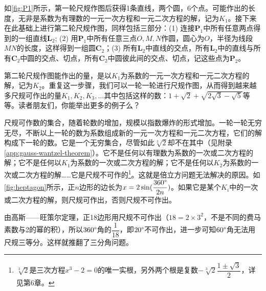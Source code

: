 \documentclass[b5paper]{ctexart}
\begin{document}
如\cref{fig:P1}所示，第一轮尺规作图后获得1条直线，两个圆，6个点。可能作出的长度，无非是系数为有理数的一元一次方程和一元二次方程的解，记为$K_1$。接下来在此基础上进行第二轮尺规作图，同样包括三部分：(1) 连接$\mathbf{P}_1$中所有任意两点得到的一组直线$\mathbf{L}_2$; (2) 用$\mathbf{P}_1$中所有任意三点$O, M, N$作圆，圆心为$O$，半径为线段$MN$的长度，这样得到一组圆$\mathbf{C}_2$；(3) 所有$\mathbf{L}_2$中直线的交点，所有$\mathbf{L}_2$中的直线与所有$\mathbf{C}_2$中圆的交点、切点，所有$\mathbf{C}_2$中圆彼此间的交点、切点，记这些点为$\mathbf{P}_2$。

第二轮尺规作图能作出的量，是以$K_1$为系数的一元一次方程和一元二次方程的解，记为$K_2$。重复这一步骤，我们可以一轮一轮进行尺规作图，从而得到越来越多尺规可作出的量$K_1, K_2, K_3, \dotsc$其中包括这样的数：$1 + \sqrt{2} + \sqrt{2\sqrt{3} - \sqrt{5}}$等等。读者朋友们，你能举出更多的例子么？

尺规可作数的集合，随着轮数的增加，规模以指数爆炸的形式增加。一轮一轮无穷无尽，不断以上一轮的数为系数组成新的一元一次方程和一元二次方程，它们的解构成下一轮的数。它是一个无穷集合，尽管如此$\sqrt[3]{2}$却不在其中（见附录\ref{app:gauss-wantzel-theorem}）。它不是任何以有理数为系数的一次或二次方程的解；它不是任何以$K_1$为系数的一次或二次方程的解；它不是任何以$K_2$为系数的一次或二次方程的解……它是尺规不可作的\footnote{$\sqrt[3]{2}$是三次方程$x^3 - 2 = 0$的唯一实根，另外两个根是复数$-\sqrt[3]{2}\dfrac{1 \pm \sqrt{3}}{2}$，详见第6章。}。这就是倍立方问题无法解决的原因。如\cref{fig:heptagon}所示，正$n$边形的边长为$x = 2\sin(\dfrac{360\degree}{2n})$。如果它是某个$K_i$中的一次或二次方程的解，则尺规可作出，否则尺规不可作出。

由高斯——旺策尔定理，正18边形用尺规不可作出（$18 = 2 \times 3^2$，不是不同的费马素数与2的幂的积），所以$360\degree$角的$\dfrac{1}{18}$，即$20\degree$不可作出，进一步可知$60\degree$角无法用尺规三等分。这样就推翻了三分角问题。
\end{document}
